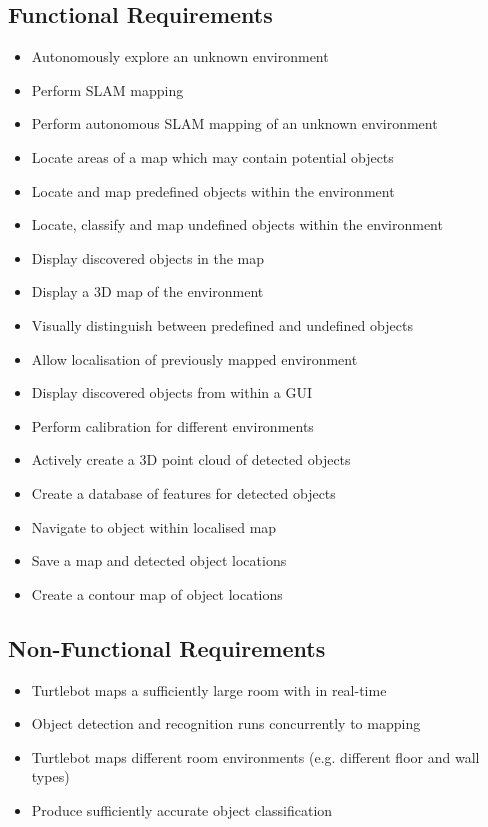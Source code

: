 \documentclass{mproj}
\begin{document}
\subsection{Functional Requirements}
\begin{itemize}
\item Autonomously explore an unknown environment
\item Perform SLAM mapping
\item Perform autonomous SLAM mapping of an unknown environment
\item Locate areas of a map which may contain potential objects
\item Locate and map predefined objects within the environment
\item Locate, classify and map undefined objects within the environment
\item Display discovered objects in the map
\item Display a 3D map of the environment
\item Visually distinguish between predefined and undefined objects
\item Allow localisation of previously mapped environment
\item Display discovered objects from within a GUI
\item Perform calibration for different environments
\item Actively create a 3D point cloud of detected objects
\item Create a database of features for detected objects
\item Navigate to object within localised map 
\item Save a map and detected object locations
\item Create a contour map of object locations
\end{itemize}
 
\subsection{Non-Functional Requirements}
\begin{itemize}
\item Turtlebot maps a sufficiently large room with in real-time
\item Object detection and recognition runs concurrently to mapping
\item Turtlebot maps different room environments (e.g. different floor and wall types)
\item Produce sufficiently accurate object classification
\end{itemize}
\end{document}
